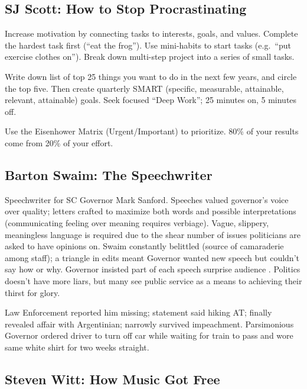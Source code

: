 \documentclass[
]{article}
\begin{document}
\hypertarget{sj-scott-how-to-stop-procrastinating}{%
\subsection{SJ Scott: How to Stop
Procrastinating}\label{sj-scott-how-to-stop-procrastinating}}

Increase motivation by connecting tasks to interests, goals, and values.
Complete the hardest task first (``eat the frog''). Use mini-habits to
start tasks (e.g.~``put exercise clothes on''). Break down multi-step
project into a series of small tasks.

Write down list of top 25 things you want to do in the next few years,
and circle the top five. Then create quarterly SMART (specific,
measurable, attainable, relevant, attainable) goals. Seek focused ``Deep
Work''; 25 minutes on, 5 minutes off.

Use the Eisenhower Matrix (Urgent/Important) to prioritize. 80\% of your
results come from 20\% of your effort.

\hypertarget{barton-swaim-the-speechwriter}{%
\subsection{Barton Swaim: The
Speechwriter}\label{barton-swaim-the-speechwriter}}

Speechwriter for SC Governor Mark Sanford. Speeches valued governor's
voice over quality; letters crafted to maximize both words and possible
interpretations (communicating feeling over meaning requires verbiage).
Vague, slippery, meaningless language is required due to the shear
number of issues politicians are asked to have opinions on. Swaim
constantly belittled (source of camaraderie among staff); a triangle in
edits meant Governor wanted new speech but couldn't say how or why.
Governor insisted part of each speech surprise audience . Politics
doesn't have more liars, but many see public service as a means to
achieving their thirst for glory.

Law Enforcement reported him missing; statement said hiking AT; finally
revealed affair with Argentinian; narrowly survived impeachment.
Parsimonious Governor ordered driver to turn off car while waiting for
train to pass and wore same white shirt for two weeks straight.

\hypertarget{steven-witt-how-music-got-free}{%
\subsection{Steven Witt: How Music Got
Free}\label{steven-witt-how-music-got-free}}
\end{document}
